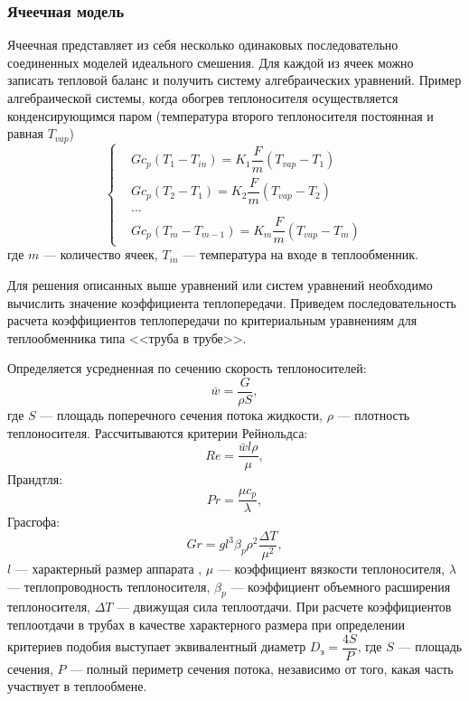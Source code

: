 \subsubsection*{Ячеечная модель}
Ячеечная представляет из себя несколько одинаковых последовательно соединенных моделей идеального смешения. Для каждой из ячеек можно записать тепловой баланс и получить систему алгебраических уравнений. Пример алгебраической системы, когда обогрев теплоносителя осуществляется конденсирующимся паром (температура второго теплоносителя постоянная и равная $T_{vap}$) 
 \begin{equation}\label{eq:tep.yam}
\left\{
\begin{aligned}
&G c_p ( T_{1} - T_{in} ) = K_1 \dfrac {F} {m} ( T_{vap} - T_{1} )        \\
&G c_p ( T_{2} - T_{1} ) = K_2 \dfrac {F} {m} ( T_{vap} - T_{2} )	\\
& ... \\
&G c_p ( T_{m} - T_{m-1} ) = K_m \dfrac {F} {m} ( T_{vap} - T_{m} )            
\end{aligned}
\right. 
\end{equation}
где $m$ --- количество ячеек, $T_{in}$ --- температура на входе в теплообменник.


Для решения описанных выше уравнений или систем уравнений необходимо вычислить значение коэффициента теплопередачи. Приведем последовательность расчета коэффициентов теплопередачи по критериальным уравнениям для теплообменника типа <<труба в трубе>>.

Определяется усредненная по сечению скорость теплоносителей:
\begin{equation}
	\bar{w} = \dfrac{ G}{\rho S},
\end{equation}
где $S$ --- площадь поперечного сечения потока жидкости, $\rho$ --- плотность теплоносителя.
Рассчитываются критерии Рейнольдса:
\begin{equation}
Re=\dfrac{\bar{w} l \rho}{\mu},
\end{equation}
Прандтля:
\begin{equation}
Pr=\dfrac{\mu c_p}{\lambda},
\end{equation}
Грасгофа:
\begin{equation}
Gr= g l^3 \beta_p \rho^2 \dfrac{\Delta T}{\mu^2},
\end{equation}
$l$ --- характерный размер аппарата , $\mu$ --- коэффициент вязкости теплоносителя, $\lambda$ --- теплопроводность теплоносителя, $\beta_p$ --- коэффициент объемного расширения теплоносителя, $\Delta T$ --- движущая сила теплоотдачи. При расчете коэффициентов теплоотдачи в трубах в качестве характерного размера при определении критериев подобия выступает эквивалентный диаметр $D_э=\dfrac{4S}{P}$, где $S$ --- площадь сечения, $P$ --- полный периметр сечения потока, независимо от того, какая часть участвует в теплообмене.

